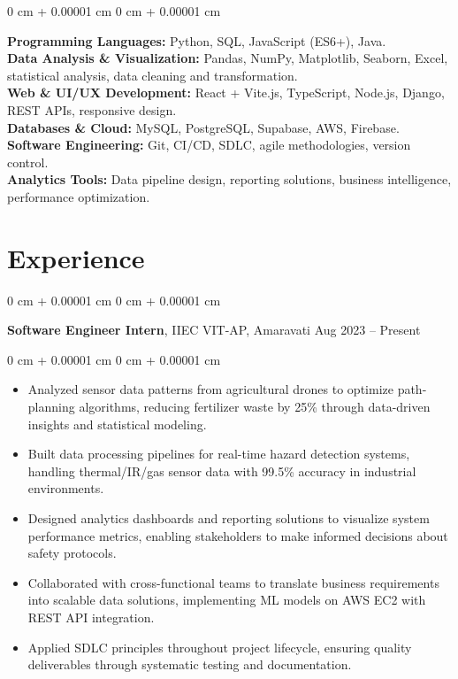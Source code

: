 \documentclass[10pt, letterpaper]{article}
\newenvironment{highlights}{ \begin{itemize}[ topsep=0.10 cm, parsep=0.10 cm, partopsep=0pt,
itemsep=0pt, leftmargin=0 cm + 10pt ] }{ \end{itemize} } %
\newenvironment{onecolentry}{ \begin{adjustwidth}{ 0 cm + 0.00001 cm }{ 0 cm + 0.00001 cm }
}{ \end{adjustwidth} } %
\newenvironment{twocolentry}[2][]{ \onecolentry \def\secondColumn{#2} \setcolumnwidth{\fill, 4.5 cm}
\begin{paracol}{2} }{ \switchcolumn \raggedleft \secondColumn \end{paracol}
\endonecolentry } %
\begin{document}
\begin{onecolentry}
		\textbf{Programming Languages:} Python, SQL, JavaScript (ES6+), Java.\\
	\vspace{0.10 cm}
		\textbf{Data Analysis \& Visualization:} Pandas, NumPy, Matplotlib, Seaborn, Excel, statistical analysis, data cleaning and transformation. \\
	\vspace{0.10 cm}
		\textbf{Web \& UI/UX Development:} React + Vite.js, TypeScript, Node.js, Django, REST APIs, responsive design. \\
	\vspace{0.10 cm}
		\textbf{Databases \& Cloud:} MySQL, PostgreSQL, Supabase, AWS, Firebase. \\
	\vspace{0.10 cm}
		\textbf{Software Engineering:} Git, CI/CD, SDLC, agile methodologies, version control.\\
	\vspace{0.10 cm}
		\textbf{Analytics Tools:} Data pipeline design, reporting solutions, business intelligence, performance optimization. \\
\end{onecolentry}



	\section{Experience}

\begin{twocolentry}
	{ Aug 2023 – Present } \textbf{Software Engineer Intern}, IIEC VIT-AP, Amaravati
\end{twocolentry}

\begin{onecolentry}
	\begin{highlights}
	\vspace{0.10 cm}
		\item Analyzed sensor data patterns from agricultural drones to optimize path-planning algorithms, reducing fertilizer waste by 25\% through data-driven insights and statistical modeling. \\
		\item Built data processing pipelines for real-time hazard detection systems, handling thermal/IR/gas sensor data with 99.5\% accuracy in industrial environments. \\
		\item Designed analytics dashboards and reporting solutions to visualize system performance metrics, enabling stakeholders to make informed decisions about safety protocols. \\
		\item Collaborated with cross-functional teams to translate business requirements into scalable data solutions, implementing ML models on AWS EC2 with REST API integration. \\
		\item Applied SDLC principles throughout project lifecycle, ensuring quality deliverables through systematic testing and documentation.
	\end{highlights}
\end{onecolentry}
\end{document}
